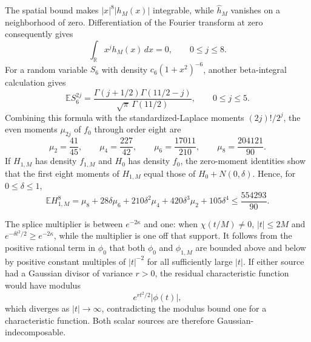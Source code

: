 The spatial bound makes \(|x|^8|h_M(x)|\) integrable, while \(\widehat h_M\) vanishes on a neighborhood of zero.  Differentiation of the Fourier transform at zero consequently gives
\[
 \int_{\mathbb R}x^j h_M(x)\,dx=0,
 \qquad 0\le j\le8.
\]
For a random variable \(S_6\) with density \(c_6(1+x^2)^{-6}\), another beta-integral calculation gives
\[
 \mathbb E S_6^{2j}
 =\frac{\Gamma(j+1/2)\Gamma(11/2-j)}
        {\sqrt\pi\,\Gamma(11/2)},
 \qquad 0\le j\le5.
\]
Combining this formula with the standardized-Laplace moments \((2j)!/2^j\), the even moments \(\mu_{2j}\) of \(f_0\) through order eight are
\[
 \mu_2=\frac{41}{45},\qquad
 \mu_4=\frac{227}{42},\qquad
 \mu_6=\frac{17011}{210},\qquad
 \mu_8=\frac{204121}{90}.
\]
If \(H_{1,M}\) has density \(f_{1,M}\) and \(H_0\) has density \(f_0\), the zero-moment identities show that the first eight moments of \(H_{1,M}\) equal those of \(H_0+N(0,\delta)\).  Hence, for \(0\le\delta\le1\),
\[
 \mathbb E H_{1,M}^8
 =\mu_8+28\delta\mu_6+210\delta^2\mu_4
  +420\delta^3\mu_2+105\delta^4
 \le\frac{554293}{90}.
\]

The splice multiplier is between \(e^{-2\kappa}\) and one: when \(\chi(t/M)\ne0\), \(|t|\le2M\) and \(e^{-\delta t^2/2}\ge e^{-2\kappa}\), while the multiplier is one off that support.  It follows from the positive rational term in \(\phi_0\) that both \(\phi_0\) and \(\phi_{1,M}\) are bounded above and below by positive constant multiples of \(|t|^{-2}\) for all sufficiently large \(|t|\).  If either source had a Gaussian divisor of variance \(r>0\), the residual characteristic function would have modulus
\[
 e^{rt^2/2}|\phi(t)|,
\]
which diverges as \(|t|\to\infty\), contradicting the modulus bound one for a characteristic function.  Both scalar sources are therefore Gaussian-indecomposable.

